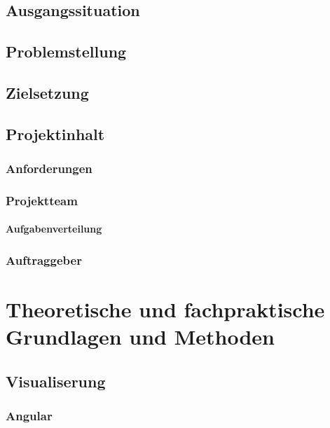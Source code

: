 \documentclass{report}
\begin{document}
\section{Ausgangssituation}
\section{Problemstellung}
\section{Zielsetzung}
\section{Projektinhalt}
\subsection{Anforderungen}
\subsection{Projektteam}
\subsubsection{Aufgabenverteilung}
\subsection{Auftraggeber}

\chapter{Theoretische und fachpraktische Grundlagen und Methoden}
\section{Visualiserung}
\subsection{Angular}
\end{document}
